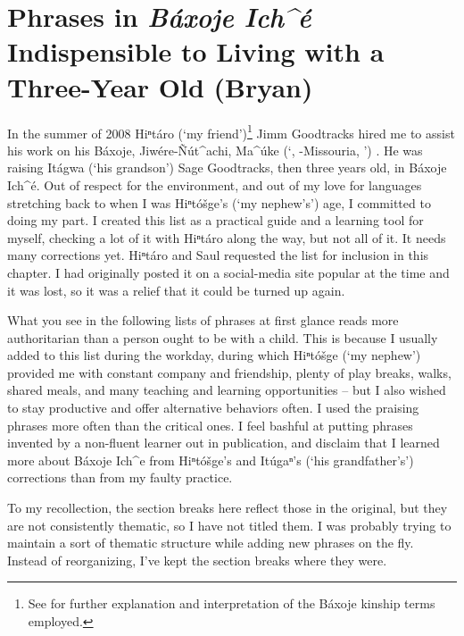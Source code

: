 \documentclass[output=paper]{LSP/langsci}
\begin{document}
\section{Phrases in \emph{Báxoje Ich\^{ }é} Indispensible to Living with a Three-Year Old (Bryan)}\label{bryan}
	In the summer of 2008 Hiⁿtáro (`my friend')\footnote{See  for further explanation and interpretation of the Báxoje kinship terms employed.} Jimm Goodtracks hired me to assist his work on his Báxoje, Jiwére-\~Nút\^{ }achi, Ma\^{ }úke (`, -Missouria, ') . He was raising Itágwa (`his grandson') Sage Goodtracks, then three years old, in Báxoje Ich\^{ }é. Out of respect for the  environment, and out of my love for languages stretching back to when I was Hiⁿtóšge's (`my nephew's') age, I committed to doing my part. I created this list as a practical guide and a learning tool for myself, checking a lot of it with Hiⁿtáro along the way, but not all of it. It needs many corrections yet. Hiⁿtáro and Saul requested the list for inclusion in this chapter. I had originally posted it on a social-media site popular at the time and it was lost, so it was a relief that it could be turned up again. 

What you see in the following lists of phrases
at first glance reads more authoritarian than a person ought to be with a child. This is because I usually added to this list during the workday, during which Hiⁿtóšge (`my nephew') provided me with constant company and friendship, plenty of play breaks, walks, shared meals, and many teaching and learning opportunities -- but I also wished to stay productive and offer alternative behaviors often. I used the praising phrases more often than the critical ones. I feel bashful at putting phrases invented by a non-fluent learner out in publication, and disclaim that I learned more about Báxoje Ich\^{ }e from Hiⁿtóšge's and Itúgaⁿ's (`his grandfather's') corrections than from my faulty practice. 

To my recollection, the section breaks here reflect those in the original, but they are not consistently thematic, so I have not titled them. I was probably trying to maintain a sort of thematic structure while adding new phrases on the fly. Instead of reorganizing, I've kept the section breaks where they were.

\end{document}
